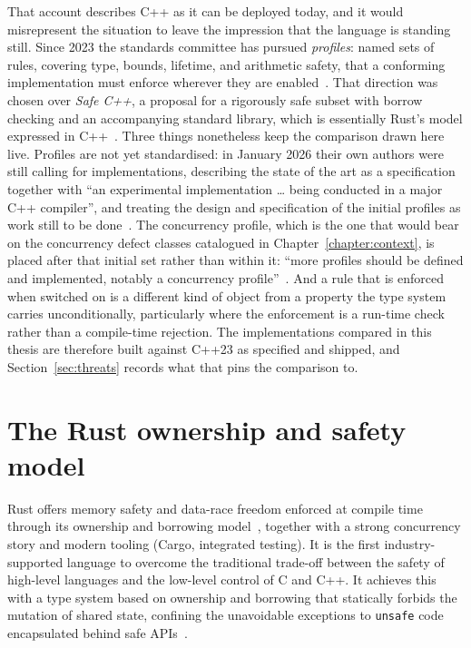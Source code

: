 \documentclass[english,twoside,openright,a4paper,censored,csm,software-track-2020]{HYthesisML}
\begin{document}
That account describes C++ as it can be deployed today, and it would misrepresent the situation
to leave the impression that the language is standing still. Since 2023 the standards committee
has pursued \emph{profiles}: named sets of rules, covering type, bounds, lifetime, and arithmetic
safety, that a conforming implementation must enforce wherever they are
enabled~\cite{sutter2025profiles}. That direction was chosen over \emph{Safe C++}, a proposal for
a rigorously safe subset with borrow checking and an accompanying standard library, which is
essentially Rust's model expressed in C++~\cite{baxter2024safecpp}. Three things nonetheless keep
the comparison drawn here live. Profiles are not yet standardised: in January 2026 their own
authors were still calling for implementations, describing the state of the art as a
specification together with ``an experimental implementation \ldots{} being conducted in a major
C++ compiler'', and treating the design and specification of the initial profiles as work still
to be done~\cite{vandevoorde2026profiles}. The concurrency profile, which is the one that would
bear on the concurrency defect classes catalogued in Chapter~\ref{chapter:context}, is placed
after that initial set rather than within it: ``more profiles should be defined and implemented,
notably a concurrency profile''~\cite{vandevoorde2026profiles}. And a rule that is enforced when
switched on is a different kind of object from a property the type system carries
unconditionally, particularly where the enforcement is a run-time check rather than a
compile-time rejection. The implementations compared in this thesis are therefore built against
C++23 as specified and shipped, and Section~\ref{sec:threats} records what that pins the
comparison to.

\section{The Rust ownership and safety model}
Rust offers memory safety and data-race freedom enforced at compile time through its
ownership and borrowing model~\cite{klabnik2023rust}, together with a strong concurrency
story and modern tooling (Cargo, integrated testing). It is the first industry-supported
language to overcome the traditional trade-off between the safety of high-level languages and
the low-level control of C and C++. It achieves this with a type system based on ownership and
borrowing that statically forbids the mutation of shared state, confining the unavoidable
exceptions to \texttt{unsafe} code encapsulated behind safe APIs~\cite{jung2021safe}.
\end{document}

